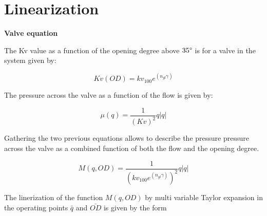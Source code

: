 \chapter{Linearization}
\label{chap:Lin}

\textbf{Valve equation}

The Kv value as a function of the opening degree above $35\degree$ is for a valve in the system given by:

\begin{equation}
	Kv(OD)=kv_{100} e^{(n_{gl} \gamma)}
\end{equation}


The pressure across the valve as a function of the flow is given by:

\begin{equation}
	\mu(q)=\frac{1}{(Kv)^2} q |q|
\end{equation}

Gathering the two previous equations allows to describe the pressure pressure across the valve as a combined function of both the flow and the opening degree.

\begin{equation}
	M(q,OD)=\frac{1}{(kv_{100} e^{(n_{gl} \gamma)})^2} q |q| 
\end{equation}	


The linerization of the function $M(q,OD)$ by multi variable Taylor expansion in the operating points $\bar{q}$ and $\bar{OD}$ is given by the form

